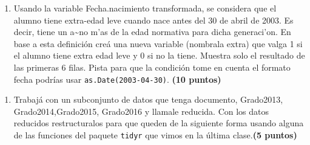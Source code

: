 \documentclass[
]{article}
\newenvironment{Shaded}{\begin{snugshade}}{\end{snugshade}}
\newcommand{\DataTypeTok}[1]{\textcolor[rgb]{0.13,0.29,0.53}{#1}}
\newcommand{\DecValTok}[1]{\textcolor[rgb]{0.00,0.00,0.81}{#1}}
\newcommand{\KeywordTok}[1]{\textcolor[rgb]{0.13,0.29,0.53}{\textbf{#1}}}
\newcommand{\NormalTok}[1]{#1}
\newcommand{\OperatorTok}[1]{\textcolor[rgb]{0.81,0.36,0.00}{\textbf{#1}}}
\newcommand{\StringTok}[1]{\textcolor[rgb]{0.31,0.60,0.02}{#1}}
\providecommand{\tightlist}{%
  \setlength{\itemsep}{0pt}\setlength{\parskip}{0pt}}
\begin{document}
\begin{Shaded}
\end{Shaded}

\begin{enumerate}
\def\labelenumi{\arabic{enumi}.}
\setcounter{enumi}{9}
\tightlist
\item
  Usando la variable Fecha.nacimiento transformada, se considera que el
  alumno tiene extra-edad leve cuando nace antes del 30 de abril de
  2003. Es decir, tiene un a\textasciitilde no m'as de la edad normativa
  para dicha generaci'on. En base a esta definición creá una nueva
  variable (nombrala extra) que valga 1 si el alumno tiene extra edad
  leve y 0 si no la tiene. Muestra solo el resultado de las primeras 6
  filas. Pista para que la condición tome en cuenta el formato fecha
  podrías usar
  \texttt{as.Date(\textquotesingle{}2003-04-30\textquotesingle{})}.
  \textbf{(10 puntos)}
\end{enumerate}

\begin{Shaded}
\end{Shaded}

\begin{enumerate}
\def\labelenumi{\arabic{enumi}.}
\setcounter{enumi}{10}
\tightlist
\item
  Trabajá con un subconjunto de datos que tenga documento, Grado2013,
  Grado2014,Grado2015, Grado2016 y llamale reducida. Con los datos
  reducidos restructuralos para que queden de la siguiente forma usando
  alguna de las funciones del paquete \texttt{tidyr} que vimos en la
  última clase.\textbf{(5 puntos)}
\end{enumerate}
\end{document}
